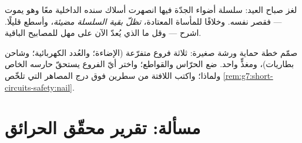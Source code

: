 \begin{exercise}[$\star\star$]\label{exo:g7:short-circuits-safety:11}
لغز صباح العيد: سلسلة أضواء الجدّة  فيها 
انصهرت أسلاك سنده الداخلية معًا وهو يموت --- فقصر نفسه. وخلافًا
للمأساة المعتادة، \emph{تظلّ بقية السلسلة مضيئة}، وأسطع قليلًا.
اشرح --- وقل ما الذي يُعدّ الآن على مهل للمصابيح الباقية.
\end{exercise}

\begin{exercise}[$\star\star\star$]\label{exo:g7:short-circuits-safety:12}
صمّم خطة حماية ورشة صغيرة: ثلاثة فروع متفرّعة (الإضاءة؛
والعُدد الكهربائية؛ وشاحن بطاريات)، ومغذٍّ واحد. ضع الحرّاس
والقواطع؛ واختر أيّ الفروع يستحقّ حارسه الخاص ولماذا؛ واكتب
اللافتة من سطرين فوق درج المصاهر التي تلخّص
\cref{rem:g7:short-circuits-safety:nail}.
\end{exercise}

\section{مسألة: تقرير محقّق الحرائق}

